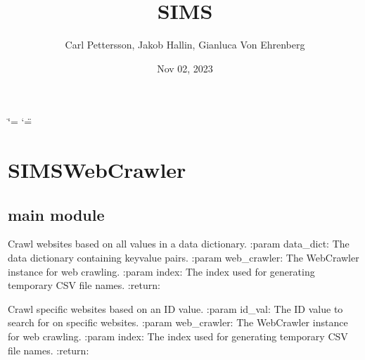 \documentclass[letterpaper,10pt,english]{sphinxmanual}
\title{SIMS}
\date{Nov 02, 2023}
\author{Carl Pettersson, Jakob Hallin, Gianluca Von Ehrenberg}
\begin{document}
\ifdefined\shorthandoff
  \ifnum\catcode`\=\string=\active\shorthandoff{=}\fi
  \ifnum\catcode`\"=\active{}\fi
\fi

\pagestyle{empty}
\sphinxmaketitle
\pagestyle{plain}
\sphinxtableofcontents
\pagestyle{normal}
\label{\detokenize{index::doc}}


\sphinxstepscope


\chapter{SIMS\sphinxhyphen{}WebCrawler}
\label{\detokenize{modules:sims-webcrawler}}\label{\detokenize{modules::doc}}
\sphinxstepscope


\section{main module}
\label{\detokenize{main:module-main}}\label{\detokenize{main:main-module}}\label{\detokenize{main::doc}}

\begin{fulllineitems}
\label{\detokenize{main:main.crawl_all}}
\pysigstartsignatures
{}
\pysigstopsignatures
\sphinxAtStartPar
Crawl websites based on all values in a data dictionary.
:param data\_dict: The data dictionary containing key\sphinxhyphen{}value pairs.
:param web\_crawler: The WebCrawler instance for web crawling.
:param index: The index used for generating temporary CSV file names.
:return:

\end{fulllineitems}


\begin{fulllineitems}
\label{\detokenize{main:main.crawl_with_id}}
\pysigstartsignatures
{}
\pysigstopsignatures
\sphinxAtStartPar
Crawl specific websites based on an ID value.
:param id\_val: The ID value to search for on specific websites.
:param web\_crawler: The WebCrawler instance for web crawling.
:param index: The index used for generating temporary CSV file names.
:return:

\end{fulllineitems}
\end{document}
